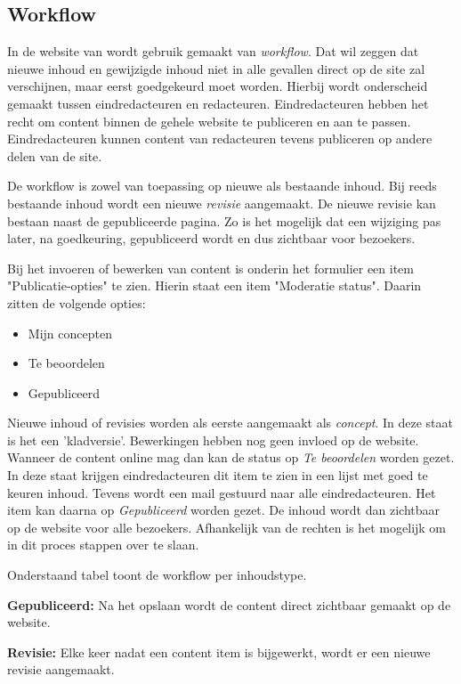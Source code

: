 \clearpage
\subsection{Workflow}\label{workflow}

In de website van \drupalpath wordt gebruik gemaakt van \emph{workflow}. Dat wil zeggen dat nieuwe inhoud en gewijzigde inhoud niet in alle gevallen direct op de site zal verschijnen, maar eerst goedgekeurd moet worden. Hierbij wordt onderscheid gemaakt tussen eindredacteuren en redacteuren. Eindredacteuren hebben het recht om content binnen de gehele website te publiceren en aan te passen. Eindredacteuren kunnen content van redacteuren tevens publiceren op andere delen van de site.

De workflow is zowel van toepassing op nieuwe als bestaande inhoud. Bij reeds bestaande inhoud wordt een nieuwe \emph{revisie} aangemaakt. De nieuwe revisie kan bestaan naast de gepubliceerde pagina. Zo is het mogelijk dat een wijziging pas later, na goedkeuring, gepubliceerd wordt en dus zichtbaar voor bezoekers.

Bij het invoeren of bewerken van content is onderin het formulier een item "Publicatie-opties" te zien. Hierin staat een item "Moderatie status". Daarin zitten de volgende opties:
\begin{itemize}
\item Mijn concepten
\item Te beoordelen
\item Gepubliceerd
\end{itemize}

Nieuwe inhoud of revisies worden als eerste aangemaakt als \emph{concept}. In deze staat is het een 'kladversie'. Bewerkingen hebben nog geen invloed op de website. Wanneer de content online mag dan kan de status op \emph{Te beoordelen} worden gezet. In deze staat krijgen eindredacteuren dit item te zien in een lijst met goed te keuren inhoud. Tevens wordt een mail gestuurd naar alle eindredacteuren. Het item kan daarna op \emph{Gepubliceerd} worden gezet. De inhoud wordt dan zichtbaar op de website voor alle bezoekers. Afhankelijk van de rechten is het mogelijk om in dit proces stappen over te slaan.


Onderstaand tabel toont de workflow per inhoudstype. 

\textbf{Gepubliceerd:} Na het opslaan wordt de content direct zichtbaar gemaakt op de website.

\textbf{Revisie:} Elke keer nadat een content item is bijgewerkt, wordt er een nieuwe revisie aangemaakt.

